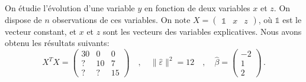 \documentclass{../headers/td_upc}
\providecommand{\1}{\mathds{1}}
\begin{document}
	 On étudie l'évolution d'une variable $y$ en fonction de deux variables $x$ et $z$.
	On dispose de $n$ observations de ces variables.
	On note $X=\begin{pmatrix}\1 & x & z\end{pmatrix}$,
	où $\1$ est le vecteur constant, et $x$ et $z$ sont les vecteurs des variables explicatives.
	Nous avons obtenu les résultats suivants:
			\[
			X^T X=\begin{pmatrix}
				30 & 0 & 0 \\
				? & 10 & 7 \\
				? & ? & 15
			\end{pmatrix}
			\quad , \quad
			\|\hat{\varepsilon}\|^{2} = 12
				\quad , \quad
			\hat{\beta} = \begin{pmatrix} -2 \\ 1 \\ 2 \end{pmatrix}\,.
			\]
\end{document}
